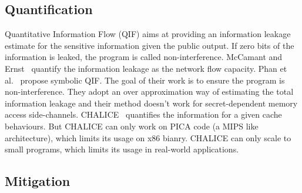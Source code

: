 \subsection{Quantification}

Quantitative Information Flow (QIF) aims at providing an information
leakage estimate for the sensitive information given the public
output. If zero bits of the information is leaked, the program is
called non-interference. McCamant and Ernst~\cite{McCamantE2008} quantify the
information leakage as the network flow
capacity. Phan et al.~\cite{Phan:2012:SQI:2382756.2382791} propose symbolic
QIF. The goal of their work is to ensure the program is
non-interference. They adopt an over approximation way of estimating
the total information leakage and their method doesn't work for
secret-dependent memory access
side-channels. CHALICE~\cite{Chattopadhyay:2017:QIL:3127041.3127044}
quantifies the information for a given cache behaviours. But CHALICE
can only work on PICA code (a MIPS like architecture), which limits
its usage on x86 bianry.  CHALICE can only scale to small programs,
which limits its usage in real-world applications.

\subsection{Mitigation}
